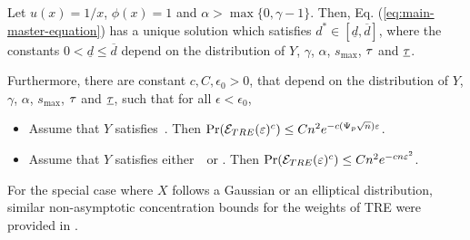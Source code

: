 \documentclass[times,sort&compress,3p]{elsarticle}
\begin{document}
\begin{theorem}
    \label{thm:main_tyler_reg}
    Let $u(x)=1/x$, $\phi(x)=1$ and ${\alpha>\max\{0,\gamma-1\}}$. 
    Then,
    Eq. (\ref{eq:main-master-equation}) has a unique solution which satisfies $d^*\in [\underline{d},\overline{d}]$, where 
    the constants $0<\underline{d}\le \overline{d}$ depend on the distribution of $Y$, $\gamma$, $\alpha$, $s_{\max}$, $\tau$ and $\underline{\tau}$.


        Furthermore, there are constant $c,C,\epsilon_0>0$, that depend on the distribution of $Y$, $\gamma$, $\alpha$, $s_{\max}$, $\tau$ and $\underline{\tau}$, such that for all $\epsilon< \epsilon_0$,
        \begin{itemize}
            \item Assume that $Y$ satisfies~\AssumLC. Then $\Pr(\mathcal{E}_{TRE}(\varepsilon)^c) \le Cn^2e^{-c(\Psi_p\sqrt{n})\varepsilon}$.  
            \item Assume that $Y$ satisfies either~\AssumIndep~or \AssumCCPSB. Then ${\Pr(\mathcal{E}_{TRE}(\varepsilon)^c) \le Cn^2e^{-cn\varepsilon^2}}$.  
        \end{itemize}

\end{theorem}
For the special case where $X$ follows a Gaussian or an elliptical distribution, similar non-asymptotic concentration bounds for the weights of TRE were provided in \cite{goes2017robust}.
\end{document}
